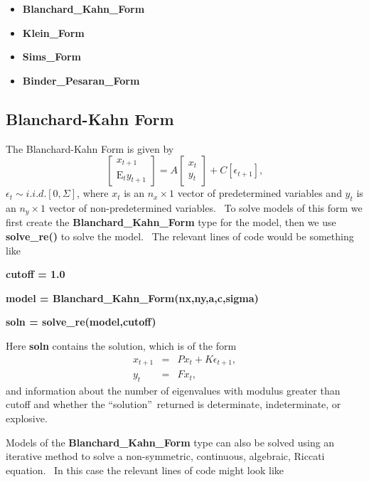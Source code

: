 \documentclass[thmsa,notitlepage,11pt]{article}
\begin{document}
\begin{itemize}
\item \textbf{Blanchard\_Kahn\_Form}

\item \textbf{Klein\_Form}

\item \textbf{Sims\_Form}

\item \textbf{Binder\_Pesaran\_Form}
\end{itemize}

\subsection{Blanchard-Kahn Form}

The Blanchard-Kahn Form is given by%
\[
\left[ 
\begin{array}{c}
x_{t+1} \\ 
\text{E}_{t}y_{t+1}%
\end{array}%
\right] =A\left[ 
\begin{array}{c}
x_{t} \\ 
y_{t}%
\end{array}%
\right] +C\left[ \epsilon _{t+1}\right] , 
\]%
$\epsilon _{t}\sim i.i.d.[0,\Sigma ]$, where $x_{t}$ is an $n_{x}\times 1$
vector of predetermined variables and $y_{t}$ is an $n_{y}\times 1$ vector
of non-predetermined variables. \ To solve models of this form we first
create the \textbf{Blanchard\_Kahn\_Form} type for the model, then we use 
\textbf{solve\_re()} to solve the model. \ The relevant lines of code would
be something like

\bigskip

\textbf{cutoff = 1.0}

\textbf{model = Blanchard\_Kahn\_Form(nx,ny,a,c,sigma)}

\textbf{soln = solve\_re(model,cutoff)}

\bigskip

Here \textbf{soln} contains the solution, which is of the form%
\begin{eqnarray*}
x_{t+1} &=&Px_{t}+K\epsilon _{t+1}, \\
y_{t} &=&Fx_{t},
\end{eqnarray*}%
and information about the number of eigenvalues with modulus greater than
cutoff and whether the \textquotedblleft solution\textquotedblright\
returned is determinate, indeterminate, or explosive.

Models of the \textbf{Blanchard\_Kahn\_Form} type can also be solved using
an iterative method to solve a non-symmetric, continuous, algebraic, Riccati
equation. \ In this case the relevant lines of code might look like
\end{document}
